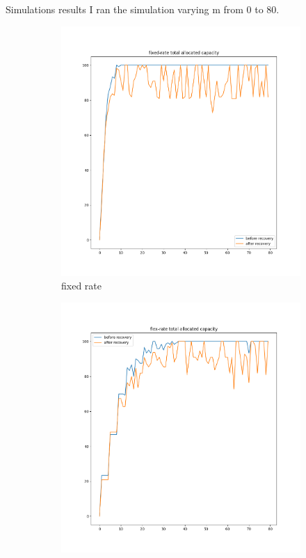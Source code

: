 \documentclass{beamer}
\begin{document}
	\begin{frame}{Simulations results}
		I ran the simulation varying m from 0 to 80.
		\begin{figure}
			\begin{subfigure}{0.31\textwidth}
				\includegraphics[width=\linewidth]{Pictures/fixed rate capacity.png}
				\caption{fixed rate}
			\end{subfigure}
			\hspace*{\fill}
			\begin{subfigure}{0.31\textwidth}
				\includegraphics[width=\linewidth]{Pictures/flex rate capacity.png}

\end{subfigure}
\end{figure}
\end{frame}
\end{document}
